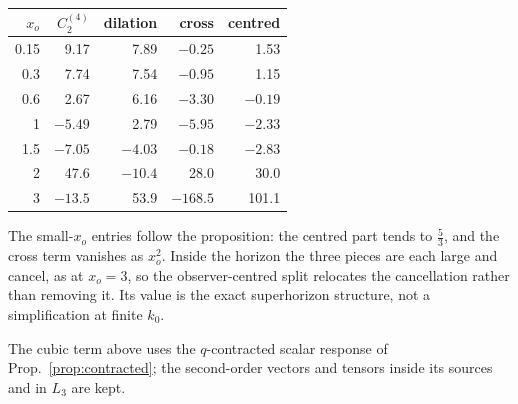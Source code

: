 \begin{center}
\begin{tabular}{rrrrr}
\toprule
$x_o$ & $C^{(4)}_2$ & dilation & cross & centred\\\midrule
0.15 & 9.17 & 7.89 & $-0.25$ & 1.53\\
0.3  & 7.74 & 7.54 & $-0.95$ & 1.15\\
0.6  & 2.67 & 6.16 & $-3.30$ & $-0.19$\\
1    & $-5.49$ & 2.79 & $-5.95$ & $-2.33$\\
1.5  & $-7.05$ & $-4.03$ & $-0.18$ & $-2.83$\\
2    & 47.6 & $-10.4$ & 28.0 & 30.0\\
3    & $-13.5$ & 53.9 & $-168.5$ & 101.1\\
\bottomrule
\end{tabular}
\end{center}
The small-$x_o$ entries follow the proposition: the centred part tends to $\frac53$, and the
cross term vanishes as $x_o^2$. Inside the horizon the three pieces are each large and
cancel, as at $x_o=3$, so the observer-centred split relocates the cancellation rather
than removing it. Its value is the exact superhorizon structure, not a simplification at
finite $k_0$.

The cubic term above uses the $q$-contracted scalar response of Prop.~\ref{prop:contracted}; the second-order vectors and tensors inside its sources and in $L_3$ are kept.
